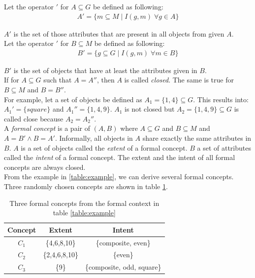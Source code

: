\documentclass[11pt]{report}
\begin{document}
Let the operator $'$ for $A \subseteq G$ be defined as following:
\begin{align*}
	A' = \{ m \subseteq M\; |\;  I(g, m)\;   \forall g \in A\}
\end{align*}

$A'$ is the set of those attributes that are present in all objects from given $A$. \\

Let the operator $'$ for $B \subseteq M$ be defined as following:
\begin{align*}
	B' = \{ g \subseteq G\; |\;  I(g, m)\;   \forall m \in B\}
\end{align*}

$B'$ is the set of objects that have at least the attributes given in $B$. \\

If for $A \subseteq G$ such that $A = A''$, then $A$ is called \textit{closed}. The same is true for $B \subseteq M$ and $B = B''$. \\

For example, let a set of objects be defined as $A_1 = \{1,4\} \subseteq G$. This results into: $A_1' = \{square\}$ and $A_1'' = \{1,4,9\}$. $A_1$ is not closed but $A_2 = \{1,4,9\} \subseteq G$ is called close because $A_2 = A_2''$. \\   

A \textit{formal concept} is a pair of $(A, B)$ where $A \subseteq G$ and $B \subseteq M$ and $A = B' \wedge B = A' $. Informally, all objects in $A$ share exactly the same attributes in $B$. $A$ is a set of objects called the \textit{extent} of a formal concept. $B$ a set of attributes called the \textit{intent} of a formal concept. The extent and the intent of all formal concepts are always closed.\\

From the example in \ref{table:example}, we can derive several formal concepts. Three randomly chosen concepts are shown in table \ref{table:exampleConcepts}. \\

\begin{table}[h]
\caption{Three formal concepts from the formal context in table \ref{table:example}}
\label{table:exampleConcepts}
\centering

\def\arraystretch{1.2}%
\begin{tabular}{ c c c }
\hline
 Concept & Extent & Intent \\
\hline

$C_1$ & \{4,6,8,10\} & \{composite, even\} \\
$C_2$ & \{2,4,6,8,10\} & \{even\} \\
$C_3$ & \{9\} & \{composite, odd, square\} \\

\hline
\end{tabular}
\end{table}
\end{document}
